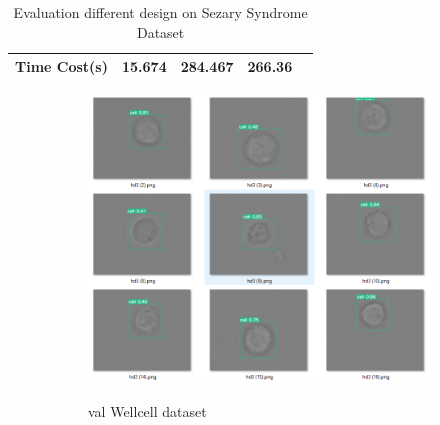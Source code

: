 \begin{table}[t]
{\begin{tabular}{@{}clccc@{}}
Time Cost(s)                                   & 15.674                                                                                                              & 284.467                                                                                                                             & 266.36                                                                                                                                                            \\ \bottomrule
\end{tabular}}
\caption{Evaluation different design on Sezary Syndrome Dataset}
\end{table}


\begin{figure}[t]
	\begin{center}
		\begin{subfigure}[c]{0.6\textwidth}
			\includegraphics[width=\textwidth]{thesis-template-master/images/An illustration test performance of CellYolo best weight.png}
			\label{fig:Debris}
			\caption{val Wellcell dataset}
		\end{subfigure}
		\begin{subfigure}[c]{0.6\textwidth}

\end{subfigure}
\end{center}
\end{figure}
